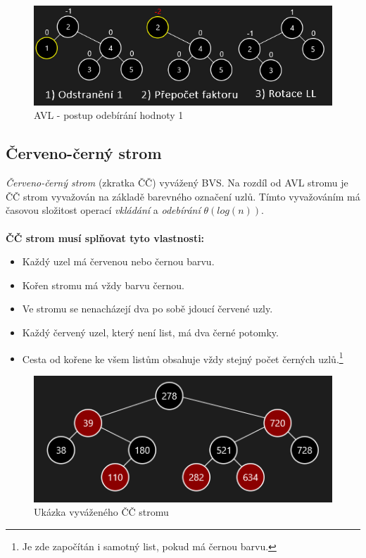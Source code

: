 \documentclass[
  biblatex=false,
  font=serif,
  glossaries=false,
  tables=false,
  theorems=false,
  index
]{kidiplom}
\begin{document}
\begin{figure}[h!]
\centering
	\includegraphics[scale=0.55]{obrazky/16AVLOdebirani.png}
	\caption{AVL - postup odebírání hodnoty 1}
\end{figure}

\newpage
\subsection{Červeno-černý strom}
\indent\indent\textit{Červeno-černý strom} (zkratka ČČ) vyvážený BVS. Na rozdíl od AVL stromu je ČČ strom vyvažován na základě barevného označení uzlů. Tímto vyvažováním má časovou složitost operací \textit{vkládání} a \textit{odebírání} $\theta(log (n))$.\\
\indent\textit{}\cite{dvorsky}\\

\noindent\textbf{ČČ strom musí splňovat tyto vlastnosti:}
\begin{itemize}
\item Každý uzel má červenou nebo černou barvu.
\item Kořen stromu má vždy barvu černou.
\item Ve stromu se nenacházejí dva po sobě jdoucí červené uzly.
\item Každý červený uzel, který není list, má dva černé potomky.
\item Cesta od kořene ke všem listům obsahuje vždy stejný počet černých uzlů.\footnote{Je zde započítán i samotný list, pokud má černou barvu.} 
\end{itemize}

\begin{figure}[h!]
\centering
	\includegraphics[scale=1]{obrazky/17CCUkazka.png}
	\caption{Ukázka vyváženého ČČ stromu}
\end{figure}
\end{document}
